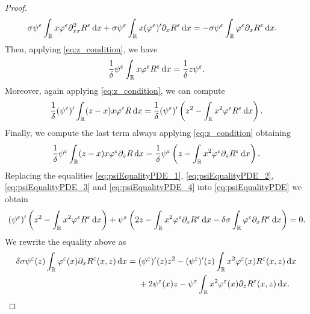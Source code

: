 \documentclass[10pt]{article}
\begin{document}
\begin{proof}
\begin{equation}\label{eq:psiEqualityPDE_1}
\begin{aligned}
	\sigma \psi^\varepsilon \int_{\mathbb{R}}  x \varphi^\varepsilon \partial^2_{xx} R^\varepsilon \,\mathrm{d} x+ \sigma \psi^\varepsilon \int_{\mathbb{R}} x (\varphi^\varepsilon)' \partial_x R^\varepsilon \,\mathrm{d} x &= -\sigma \psi^\varepsilon \int_{\mathbb{R}} \varphi^\varepsilon \partial_x R^\varepsilon \,\mathrm{d} x.
\end{aligned}
\end{equation}
Then, applying \eqref{eq:z_condition}, we have
\begin{equation}\label{eq:psiEqualityPDE_2}
	\frac1\delta \psi^\varepsilon \int_{\mathbb{R}} x \varphi^\varepsilon  R^\varepsilon \,\mathrm{d} x = \frac1\delta z \psi^\varepsilon.
\end{equation}
Moreover, again applying \eqref{eq:z_condition}, we can compute
\begin{equation}\label{eq:psiEqualityPDE_3}
\begin{aligned}
	\frac1\delta (\psi^\varepsilon)' \int_{\mathbb{R}} (z-x)x \varphi^\varepsilon  R \,\mathrm{d} x = \frac1\delta (\psi^\varepsilon)' \left(z^2 - \int_{\mathbb{R}} x^2 \varphi^\varepsilon R^\varepsilon \,\mathrm{d} x\right).
\end{aligned}
\end{equation}
Finally, we compute the last term always applying \eqref{eq:z_condition} obtaining
\begin{equation}\label{eq:psiEqualityPDE_4}
	\frac1\delta \psi^\varepsilon \int_{\mathbb{R}} (z-x)x \varphi^\varepsilon \partial_z R \,\mathrm{d} x = \frac1\delta \psi^\varepsilon\left(z - \int_{\mathbb{R}} x^2 \varphi^\varepsilon \partial_z R^\varepsilon \,\mathrm{d} x\right).
\end{equation}
Replacing the equalities \eqref{eq:psiEqualityPDE_1}, \eqref{eq:psiEqualityPDE_2}, \eqref{eq:psiEqualityPDE_3} and \eqref{eq:psiEqualityPDE_4} into \eqref{eq:psiEqualityPDE} we obtain
\begin{equation}
(\psi^\varepsilon)' \left ( z^2 - \int_{\mathbb{R}} x^2 \varphi^\varepsilon R^\varepsilon \,\mathrm{d} x \right ) + \psi^\varepsilon \left ( 2z - \int_{\mathbb{R}} x^2 \varphi^\varepsilon \partial_z R^\varepsilon \,\mathrm{d} x - \delta \sigma \int_{\mathbb{R}} \varphi^\varepsilon \partial_x R^\varepsilon \,\mathrm{d} x \right ) = 0.
\end{equation}
We rewrite the equality above as
\begin{equation} \label{eq:psiEquality}
\delta \sigma \psi^\epl(z) \int_{\R} \phi^\epl(x) \partial_x R^\epl(x, z) \dd x = 
\begin{aligned}[t] &(\psi^\epl)'(z) z^2 - (\psi^\epl)'(z) \int_{\R} x^2 \phi^\epl(x) R^\epl(x, z) \dd x \\
& + 2 \psi^\epl(x) z - \psi^\epl \int_{\R} x^2 \phi^\epl(x) \partial_z R^\epl(x, z) \dd x.
\end{aligned}

\end{equation}
\end{proof}
\end{document}
